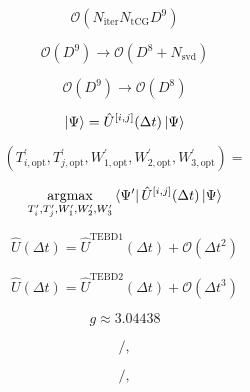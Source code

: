 \documentclass{article}
\let\Re\relax
\DeclareMathOperator{\Re}{Re}
\DeclareMathOperator{\argmax}{argmax}
\begin{document}
	\begin{equation}
		\mathcal{O}(N_\text{iter}N_\text{tCG}D^9)
	\end{equation}
	
	\begin{equation}
		\mathcal{O}(D^9) \rightarrow \mathcal{O}(D^8+N_\text{svd})
	\end{equation}
	
	\begin{equation}
		\mathcal{O}(D^9) \rightarrow \mathcal{O}(D^8)
	\end{equation}
	
	\begin{equation}
		\ket{\Psi} = \hat{U}^{[i,j]}(\Delta t) \ket{\Psi}
	\end{equation}
	
	\begin{equation}
		(T_{i,\text{opt}}^\prime, T_{j,\text{opt}}^\prime, W_{1,\text{opt}}^\prime, W_{2,\text{opt}}^\prime, W_{3,\text{opt}}^\prime)= 
	\end{equation}
	
	\begin{equation}
		\underset{T_i^\prime, T_j^\prime, W_1^\prime, W_2^\prime, W_3^\prime}{\argmax}\Re\bra{\Psi^\prime}\hat{U}^{[i,j]}(\Delta t)\ket{\Psi}
	\end{equation}
	
	\begin{equation}
		\hat{U}(\Delta t) = \hat{U}^\text{TEBD1}(\Delta t) + \mathcal{O}(\Delta t^2)
	\end{equation}
	
	\begin{equation}
		\hat{U}(\Delta t) = \hat{U}^\text{TEBD2}(\Delta t) + \mathcal{O}(\Delta t^3)
	\end{equation}
	
	\begin{equation}
		g \approx 3.04438
	\end{equation}
	
	\begin{equation}
		/,
	\end{equation}
	
	\begin{equation}
		/,
	\end{equation}
\end{document}
